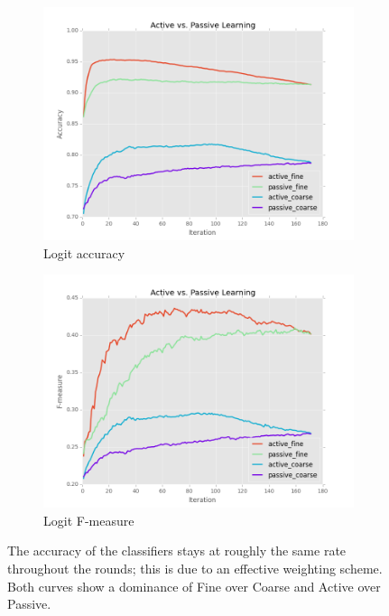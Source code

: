 \documentclass[ms]{nuthesis}
\begin{document}
\FloatBarrier
\begin{figure}[!htb]
    \centering
    \begin{subfigure}[t]{0.75\textwidth}
        \centering
        \includegraphics[width=\textwidth]{fig/runActPassLogReg_acc}
        \caption{Logit accuracy}
    \end{subfigure}%

    \begin{subfigure}[t]{0.75\textwidth}
        \centering
        \includegraphics[width=\textwidth]{fig/runActPassLogReg_f1}
        \caption{Logit F-measure}
    \end{subfigure}
    \caption{The accuracy of the classifiers stays at
roughly the same rate throughout the rounds; this is due to an effective
weighting scheme. Both curves show a dominance of Fine over Coarse and
Active over Passive.}
    \label{fig:ActiveVsPassiveAccFmesLR}
\end{figure}
\FloatBarrier
\end{document}
